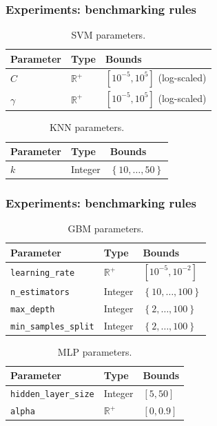 \documentclass[10pt,usenames,dvipsnames]{beamer}
\begin{document}
		
		\begin{frame}
		\frametitle{Experiments: benchmarking rules}
		\begin{table}[]
		\centering
		\caption{SVM parameters.}
		\label{svmparam}
		\begin{tabular}{@{}lll@{}}
		\toprule
		\textbf{Parameter} & \textbf{Type}                      & \textbf{Bounds}               \\ \midrule
		$C$                & $\mathbb{R}^+$ & $\left[ 10^{-5}, 10^{5} \right]$ (log-scaled) \\
		$\gamma$           & $\mathbb{R}^+$ & $\left[10^{-5}, 10^{5} \right]$  (log-scaled)       \\ 					\bottomrule
		\end{tabular}
		\end{table}
		
		\begin{table}[]
		\centering
		\caption{KNN parameters.}
		\label{knnparams}
		\begin{tabular}{@{}lll@{}}
		\toprule
		\textbf{Parameter} & \textbf{Type} & \textbf{Bounds}                           \\ \midrule
		$k$                & Integer       & $\left\lbrace 10, \dots,50 \right\rbrace$
		\end{tabular}
		\end{table}
		\end{frame}
		
		\begin{frame}
		\frametitle{Experiments: benchmarking rules}
		\begin{table}[]
		\centering
		\caption{GBM parameters.}
		\label{gbmparam}
		\begin{tabular}{@{}lll@{}}
		\toprule
		\textbf{Parameter}             & \textbf{Type}  & \textbf{Bounds}                          \\ \midrule
	\texttt{learning\_rate}      & $\mathbb{R}^+$ & $\left[10^{-5}, 10^{-2}\right]$                         \\
	\texttt{n\_estimators}       & Integer        & $\left\lbrace 10,\dots, 100 \right\rbrace$ \\
	\texttt{max\_depth}          & Integer        & $\left\lbrace 2, \dots, 100 \right\rbrace$ \\
	\texttt{min\_samples\_split}  & Integer        & $\left\lbrace 2, \dots, 100 \right\rbrace$
	\end{tabular}
	\end{table}

\begin{table}[]
\centering
\caption{MLP parameters.}
\label{mlpparam}
\begin{tabular}{lll}
\hline
\textbf{Parameter}             & \textbf{Type}    & \textbf{Bounds}       \\ \hline
\texttt{hidden\_layer\_size} & Integer          & $\left[5, 50\right]$  \\
\texttt{alpha}               & $\mathbb{R}^{+}$ & $\left[0, 0.9\right]$
\end{tabular}
\end{table}

	
		\end{frame}
		
\end{document}
